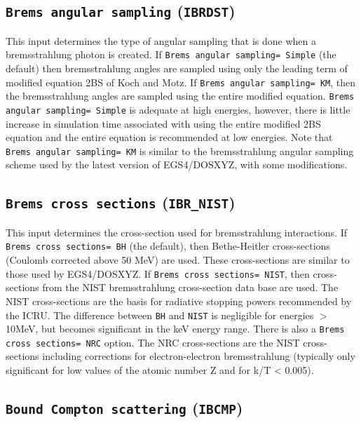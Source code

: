 \documentclass[12pt,twoside]{article}      %
\begin{document}
\subsection{{\tt Brems angular sampling} ({\tt IBRDST})}

This input determines the type of angular sampling that is done when
a bremsstrahlung photon is created.   If {\tt Brems angular sampling= Simple}
(the default) then bremsstrahlung angles are sampled using only the leading
term of modified equation 2BS of Koch and Motz\cite{Bi89,KM59}. If
{\tt Brems angular sampling= KM}, then the bremsstrahlung angles are sampled
using the entire modified equation.
{\tt Brems angular sampling= Simple} is adequate at high energies,
however, there is little increase in simulation time associated with using
the entire modified 2BS equation and the entire equation is recommended
at low energies.
Note that {\tt Brems angular sampling= KM} is similar to the bremsstrahlung
angular sampling scheme used by the latest version of EGS4/DOSXYZ, with some
modifications.

\subsection{{\tt Brems cross sections} ({\tt IBR\_NIST})}

This input determines the cross-section used for bremsstrahlung interactions.
If {\tt Brems cross sections= BH} (the default), then Bethe-Heitler cross-sections
(Coulomb corrected above 50 MeV)\cite{KM59} are used.  These cross-sections
are similar to those used by EGS4/DOSXYZ.  If {\tt Brems cross sections= NIST}, then
cross-sections from the NIST bremsstrahlung cross-section data base\cite{SB85,SB86a}
are used.  The NIST cross-sections are the basis for radiative stopping powers
recommended by the ICRU\cite{ICRU37}.  The difference between {\tt BH} and
{\tt NIST} is negligible for energies $>$ 10MeV, but becomes significant in
the keV energy range. There is also
a {\tt Brems cross sections= NRC} option.  The NRC cross-sections
are the NIST cross-sections including corrections for electron-electron
bremsstrahlung (typically only
significant for low values of the atomic number Z and for k/T < 0.005).

\subsection{{\tt Bound Compton scattering} ({\tt IBCMP})}
\label{bcsect}
\end{document}
